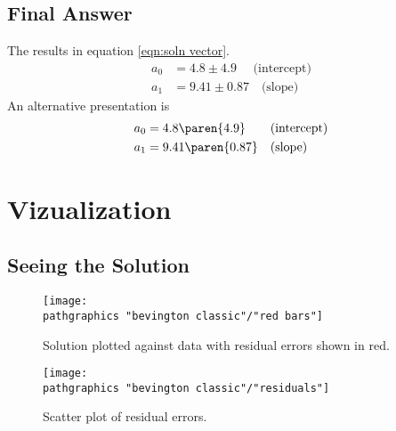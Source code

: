 \subsection{Final Answer}  %

The results in equation \eqref{eqn:soln vector}.
  \begin{equation*}
    \begin{split}
      a_{0} &= 4.8 \pm 4.9 \quad \text{\ \ \ (intercept)} \\
      a_{1} &= 9.41 \pm 0.87 \quad \text{(slope)}
    \end{split}
    \label{eqn:soln vector}
  \end{equation*}
An alternative presentation is
  \begin{equation*}
    \begin{split}
      a_{0} &= 4.8 \paren{4.9} \quad \text{\ \ \ (intercept)} \\
      a_{1} &= 9.41 \paren{0.87} \quad \text{(slope)}
    \end{split}
  \end{equation*}

\section{Vizualization}  %

\subsection{Seeing the Solution}  %

\begin{figure}[htbp] %
   \centering
   \texttt{[image: \\pathgraphics "bevington classic"/"red bars"]} 
   \caption[Solution plotted against data with residual errors shown in red.]{Solution plotted against data with residual errors shown in red.}
\end{figure}

\begin{figure}[htbp] %
   \centering
   \texttt{[image: \\pathgraphics "bevington classic"/"residuals"]} 
   \caption[Scatter plot of residual errors.]{Scatter plot of residual errors.}
\end{figure}

